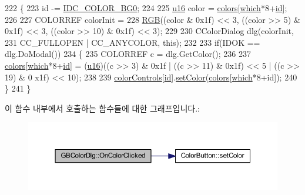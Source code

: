 \begin{DoxyCode}
222 \{
223   \textcolor{keywordtype}{id} -= \mbox{\hyperlink{resource_8h_ab773ac83ae1ef4a4312f7fa9af9813d3}{IDC\_COLOR\_BG0}};
224   
225   \mbox{\hyperlink{_system_8h_a9e6c91d77e24643b888dbd1a1a590054}{u16}} color = \mbox{\hyperlink{class_g_b_color_dlg_a24de2e906e28d7b4a006d68d6c8afeee}{colors}}[\mbox{\hyperlink{class_g_b_color_dlg_a8f7bbf1c4a4ffe4a6c57454b9087ff28}{which}}*8+\mbox{\hyperlink{_commands_8cpp_a7b7a6396b2c82ad46c6d8b2bf141a8dd}{id}}];
226 
227   COLORREF colorInit =
228       \mbox{\hyperlink{bilinear_8cpp_a4a118ad3ee36468a3fa616977a64864e}{RGB}}((color & 0x1f) << 3, ((color >> 5) & 0x1f) << 3, ((color >> 10) & 0x1f) << 3);
229 
230   CColorDialog dlg(colorInit,
231                    CC\_FULLOPEN | CC\_ANYCOLOR, \textcolor{keyword}{this});
232 
233   \textcolor{keywordflow}{if}(IDOK == dlg.DoModal())
234   \{
235     COLORREF c = dlg.GetColor();
236     
237     \mbox{\hyperlink{class_g_b_color_dlg_a24de2e906e28d7b4a006d68d6c8afeee}{colors}}[\mbox{\hyperlink{class_g_b_color_dlg_a8f7bbf1c4a4ffe4a6c57454b9087ff28}{which}}*8+\mbox{\hyperlink{_commands_8cpp_a7b7a6396b2c82ad46c6d8b2bf141a8dd}{id}}] = (\mbox{\hyperlink{_system_8h_a9e6c91d77e24643b888dbd1a1a590054}{u16}})((c >> 3) & 0x1f | ((c >> 11) & 0x1f) << 5 | ((c >> 19) & 0
      x1f) << 10);
238 
239     \mbox{\hyperlink{class_g_b_color_dlg_a7b80bc0f290c7f26e84283dc7c457240}{colorControls}}[\mbox{\hyperlink{_commands_8cpp_a7b7a6396b2c82ad46c6d8b2bf141a8dd}{id}}].\mbox{\hyperlink{class_color_button_a9ff5dc144a4acd5e2551ab94506b3bb0}{setColor}}(\mbox{\hyperlink{class_g_b_color_dlg_a24de2e906e28d7b4a006d68d6c8afeee}{colors}}[\mbox{\hyperlink{class_g_b_color_dlg_a8f7bbf1c4a4ffe4a6c57454b9087ff28}{which}}*8+\textcolor{keywordtype}{id}]);
240   \}  
241 \}
\end{DoxyCode}
이 함수 내부에서 호출하는 함수들에 대한 그래프입니다.\+:
\nopagebreak
\begin{figure}[H]
\begin{center}
\leavevmode
\includegraphics[width=350pt]{class_g_b_color_dlg_a244aa29f38fa1e813aca166ba63982c6_cgraph}
\end{center}
\end{figure}
\mbox{\label{class_g_b_color_dlg_ae38cfe6c74e0cc3d920a05567fd02581}} 
